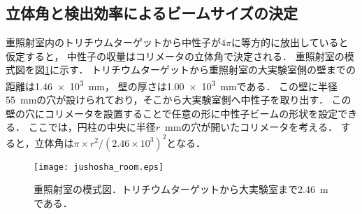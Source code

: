 \documentclass[../master]{subfiles}
\begin{document}
\subsection{立体角と検出効率によるビームサイズの決定}
重照射室内のトリチウムターゲットから中性子が$4\pi$に等方的に放出していると仮定すると，
中性子の収量はコリメータの立体角で決定される．
重照射室の模式図を図\ref{fig::jushosha_room}に示す．
トリチウムターゲットから重照射室の大実験室側の壁までの距離は\SI{1.46e3}{\milli\metre}，
壁の厚さは\SI{1.00e3}{\milli\metre}である．
この壁に半径\SI{55}{\milli\metre}の穴が設けられており，そこから大実験室側へ中性子を取り出す．
この壁の穴にコリメータを設置することで任意の形に中性子ビームの形状を設定できる．
ここでは，円柱の中央に半径$r$~\si{\milli\metre}の穴が開いたコリメータを考える．
すると，立体角は$\pi\times r^2/\left(2.46\times10^3\right)^2$となる．
\begin{figure}
  \centering
  \texttt{[image: jushosha\_room.eps]}
  \caption{重照射室の模式図．トリチウムターゲットから大実験室まで\SI{2.46}{\metre}である．}
  \label{fig::jushosha_room}
\end{figure}
\end{document}
